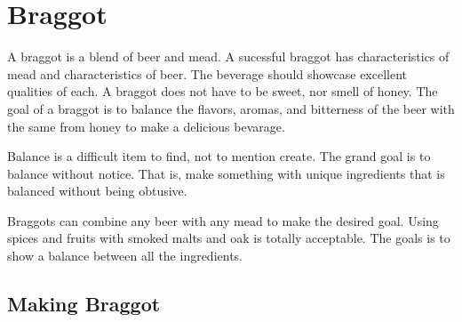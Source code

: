 \section{Braggot}
 A braggot is a blend of beer and mead. A sucessful braggot has characteristics of mead and characteristics of beer.
 The beverage should showcase excellent qualities of each.
 A braggot does not have to be sweet, nor smell of honey.
 The goal of a braggot is to balance the flavors, aromas, and bitterness of the beer with the same from honey to make a
 delicious bevarage.

 Balance is a difficult item to find, not to mention create. The grand goal is to balance without notice. That is,
 make something with unique ingredients that is balanced without being obtusive.

 Braggots can combine any beer with any mead to make the desired goal. Using spices
 and fruits with smoked malts and oak is totally acceptable. The goals is to show a balance between all
 the ingredients.

 \subsection{Making Braggot}